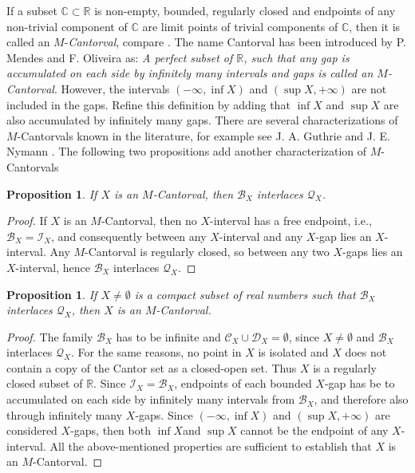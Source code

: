 \documentclass[12pt,a4paper,leqno]{amsart}
\newtheorem{pro}[thm]{Proposition}
\theoremstyle{definition}
\begin{document}
 If a subset $\mathbb C \subset \mathbb R $  is non-empty, bounded,  regularly closed and
 endpoints of any non-trivial component of $\mathbb C$ are limit points
of trivial  components of $\mathbb C$, then it is called an $M$-\textit{Cantorval}, compare \cite[Definition 13]{nit2}.
The name Cantorval has been introduced by P. Mendes and F. Oliveira \cite{mo} as:  \textit{A perfect subset of $\mathbb R$, such that any gap is accumulated on each side by
infinitely many intervals and gaps is called an $M$-Cantorval}. However, the intervals $(-\infty, \inf X)$ and $(\sup X, +\infty)$ are not included in the gaps. Refine this definition by adding that $\inf X$ and $\sup X$ are also accumulated by infinitely many gaps. There are several characterizations of $M$-Cantorvals known in the literature, for example see
 J. A. Guthrie and J. E. Nymann \cite{gn}. The following two propositions add another characterization of $M$-Cantorvals


\begin{pro}\label{p13} If  $X$ is an $M$-Cantorval, then  $\mathcal B_X$ interlaces $ \mathcal Q_X$.   
\end{pro}
\begin{proof} If $X$ is an $M$-Cantorval, then no $X$-interval has a free endpoint, i.e., $\mathcal B_X=\mathcal I_X$,  and consequently between any $X$-interval and any $X$-gap lies an $X$-interval. Any $M$-Cantorval is regularly closed, so between any two $X$-gaps lies an $X$-interval, hence  $\mathcal B_X$ interlaces $ \mathcal Q_X$.
\end{proof}

 
\begin{pro}\label{p14} If  $X\not=\emptyset$ is a compact subset of real  numbers such that $\mathcal B_X$ interlaces $ \mathcal Q_X$, then $X$ is an $M$-Cantorval.   
\end{pro}
\begin{proof} The family $\mathcal B_X$ has to be infinite and $\mathcal C_X \cup \mathcal D_X = \emptyset$, since $X\not=\emptyset$ and $\mathcal B_X$ interlaces $ \mathcal Q_X$. For the same reasons, no point in $X$ is isolated and $X$ does not contain a copy of the Cantor set as a closed-open set. Thus  $X$ is a regularly closed subset of $\mathbb R$. Since $\mathcal I_X =\mathcal B_X$, endpoints of each bounded $X$-gap has be to accumulated on each side by infinitely many intervals from $\mathcal B_X$, and therefore also through infinitely many $X$-gaps. Since $(-\infty, \inf X )$ and $(\sup X, +\infty)$ are considered $X$-gaps, then both $\inf X$and  $\sup X$ cannot be the endpoint of any $X$-interval. All the above-mentioned properties are sufficient to establish that $X$ is an $M$-Cantorval.
\end{proof}
\end{document}
